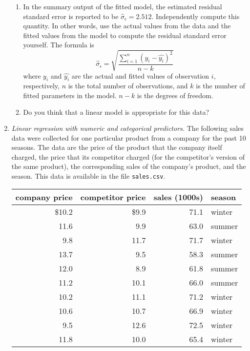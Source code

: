 \begin{enumerate}
\begin{enumerate}
  \item In the summary output of the fitted model, the estimated residual
    standard error is reported to be
    $\hat{\sigma}_{\epsilon}=2.512$. Independently compute this quantity. In
    other words, use the actual values from the data and the fitted
    values from the model to compute the residual standard error
    yourself.  The formula is
    \[ \hat{\sigma}_{\epsilon} = \sqrt{ \frac{\sum_{i=1}^n \left(y_i - \hat{y_i}\right)^2}{n-k}} \]
    where $y_i$ and $\hat{y_i}$ are the actual and fitted values of observation
    $i$, respectively, $n$ is the total number of observations, and $k$ is the
    number of fitted parameters in the model. $n-k$ is the degrees of freedom.

  \item Do you think that a linear model is appropriate for this data?
  \end{enumerate}


\item \emph{Linear regression with numeric and categorical predictors.}
  The following sales data were
  collected for one particular product from a company for the past 10
  seasons.  The data are the price of the product that the company
  itself charged, the price that its competitor charged (for the
  competitor's version of the same product), the corresponding sales
  of the company's product, and the season. This data is available
  in the file \texttt{sales.csv}.

\begin{center}
\begin{tabular}{rrrl}
company price & competitor price & sales (1000s) & season \\ \hline
         \$10.2         &     \$9.9  &71.1 &winter \\
         11.6         &     9.9  &63.0 &summer \\
          9.8         &    11.7  &71.7 &winter \\
         13.7         &     9.5  &58.3 &summer \\
         12.0         &     8.9  &61.8 &summer \\
         11.2         &    10.1  &66.0 &summer \\
         10.2         &    11.1  &71.2 &winter \\
         10.6         &    10.7  &66.9 &winter \\
          9.5         &    12.6  &72.5 &winter \\
         11.8         &    10.0  &65.4 &winter
\end{tabular}
\end{center}


\end{enumerate}
